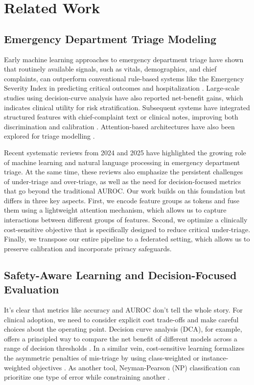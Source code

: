 \documentclass[journal,article,submit,pdftex,moreauthors]{Definitions/mdpi}
\begin{document}
\section{Related Work}\label{sec:related}

\subsection{Emergency Department Triage Modeling}

Early machine learning approaches to emergency department triage have shown that routinely available signals, such as vitals, demographics, and chief complaints, can outperform conventional rule-based systems like the Emergency Severity Index in predicting critical outcomes and hospitalization \cite{raita2019,levin2018,liu2021_sci_rep}. Large-scale studies using decision-curve analysis have also reported net-benefit gains, which indicates clinical utility for risk stratification. Subsequent systems have integrated structured features with chief-complaint text or clinical notes, improving both discrimination and calibration \cite{chang2024_bmc}. Attention-based architectures have also been explored for triage modelling \cite{gligorijevic2018}.

Recent systematic reviews from 2024 and 2025 have highlighted the growing role of machine learning and natural language processing in emergency department triage. At the same time, these reviews also emphasize the persistent challenges of under-triage and over-triage, as well as the need for decision-focused metrics that go beyond the traditional AUROC. Our work builds on this foundation but differs in three key aspects. First, we encode feature groups as tokens and fuse them using a lightweight attention mechanism, which allows us to capture interactions between different groups of features. Second, we optimize a clinically cost-sensitive objective that is specifically designed to reduce critical under-triage. Finally, we transpose our entire pipeline to a federated setting, which allows us to preserve calibration and incorporate privacy safeguards.

\subsection{Safety-Aware Learning and Decision-Focused Evaluation}

It's clear that metrics like accuracy and AUROC don't tell the whole story. For clinical adoption, we need to consider explicit cost trade-offs and make careful choices about the operating point. Decision curve analysis (DCA), for example, offers a principled way to compare the net benefit of different models across a range of decision thresholds \cite{vickers2006}. In a similar vein, cost-sensitive learning formalizes the asymmetric penalties of mis-triage by using class-weighted or instance-weighted objectives \cite{araf2024_csl_review,pes2021_cost_sens_med}. As another tool, Neyman-Pearson (NP) classification can prioritize one type of error while constraining another \cite{tong2013_np}.
\end{document}
